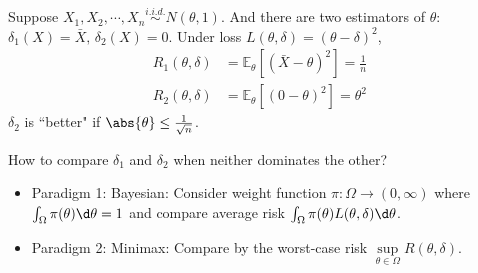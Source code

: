 \documentclass[a4paper]{article}
\begin{document}
\begin{eg}
	Suppose $X_1,X_2, \cdots, X_n\stackrel{i.i.d.}{\sim} N(\theta,1)$. And there are two estimators of $\theta$: $\delta_1(X) = \bar X ,\, \delta_2(X)= 0$. Under loss $L(\theta,\delta)=(\theta - \delta)^2$,
	\begin{equation}
		\begin{aligned}
			R_1(\theta,\delta) &= \mathbb{E}_\theta[(\bar X - \theta)^2] = \frac{1}{n} \\ 
			R_2(\theta,\delta) &= \mathbb{E}_\theta[(0 - \theta)^2] = \theta ^2
		\end{aligned}
	\end{equation}
	$\delta_2$ is ``better" if $\abs{\theta} \leq \frac{1}{\sqrt{n}}$.	
	\begin{center}
	\end{center}
\end{eg}

\begin{question}
	How to compare $\delta_1$ and $\delta_2$ when neither dominates the other?
\end{question}

\begin{answer}
	\quad
	\begin{itemize}
		\item Paradigm 1: Bayesian: Consider weight function $\pi: \Omega \to (0,\infty)$ where $\int_\Omega \pi (\theta) \d \theta = 1$ and compare average risk $\int_\Omega \pi (\theta) L(\theta,\delta) \d \theta$.
		\item Paradigm 2: Minimax: Compare by the worst-case risk $\sup\limits_{\theta \in \Omega} R(\theta,\delta)$.
	\end{itemize}
\end{answer}
\end{document}
